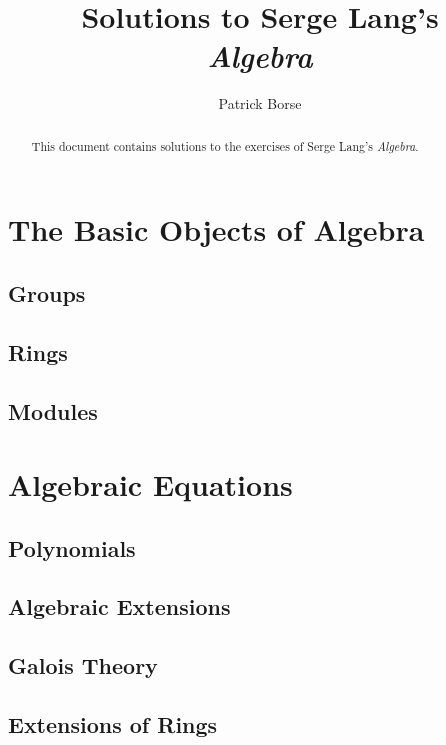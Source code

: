 \documentclass[oneside]{amsbook}
\title{Solutions to Serge Lang's\\ \emph{Algebra}}
\author{Patrick Borse}
\numberwithin{ex}{chapter}
\begin{document}
\begin{abstract}
This document contains solutions to the exercises of Serge Lang's \emph{Algebra}.
\end{abstract}

\maketitle

\tableofcontents

\part{The Basic Objects of Algebra}
\chapter{Groups}


\chapter{Rings}


\chapter{Modules}


\part{Algebraic Equations}
\chapter{Polynomials}


\chapter{Algebraic Extensions}


\chapter{Galois Theory}


\chapter{Extensions of Rings}

\end{document}
